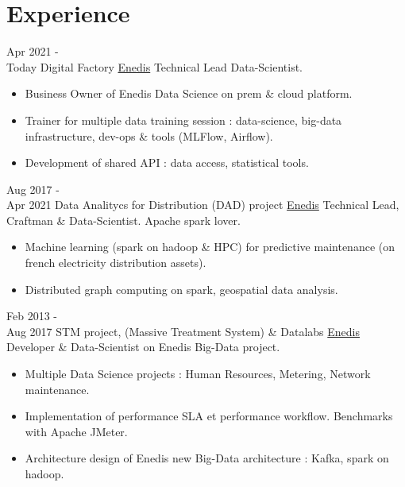 \documentclass[letterpaper]{twentysecondcv} %
\begin{document}
\makeprofile %




\section{Experience}

\begin{twenty} %

	\twentyitem
    	{Apr 2021 - \\ Today}
        {Digital Factory}
        {\href{http://www.enedis.fr/}{Enedis}}
        {Technical Lead Data-Scientist.}
        {
        {\begin{itemize}

        \item Business Owner of Enedis Data Science on prem \& cloud platform.
        \item Trainer for multiple data training session : data-science, big-data infrastructure, dev-ops \& tools (MLFlow, Airflow).
        \item Development of shared API : data access, statistical tools.

    \end{itemize}}
        }

	\twentyitem
    	{Aug 2017 - \\Apr 2021}
        {Data Analitycs for Distribution (DAD) project}
        {\href{http://www.enedis.fr/}{Enedis}}
        {Technical Lead, Craftman \& Data-Scientist. Apache spark lover.}
        {
        {\begin{itemize}
        \item Machine learning (spark on hadoop \& HPC) for predictive maintenance (on french electricity distribution assets).
        \item Distributed graph computing on spark, geospatial data analysis.

    \end{itemize}}
        }

\twentyitem
    	{Feb 2013 - \\Aug 2017}
        {STM project, (Massive Treatment System) \& Datalabs}
        {\href{http://www.enedis.fr/}{Enedis}}
        {Developer \& Data-Scientist on Enedis Big-Data project.}
        {
        {\begin{itemize}
        \item Multiple Data Science projects : Human Resources, Metering, Network maintenance.
        \item Implementation of performance SLA et performance workflow. Benchmarks with Apache JMeter.
        \item Architecture design of Enedis new Big-Data architecture : Kafka, spark on hadoop.
    \end{itemize}}
        }


\end{twenty}
\end{document}
